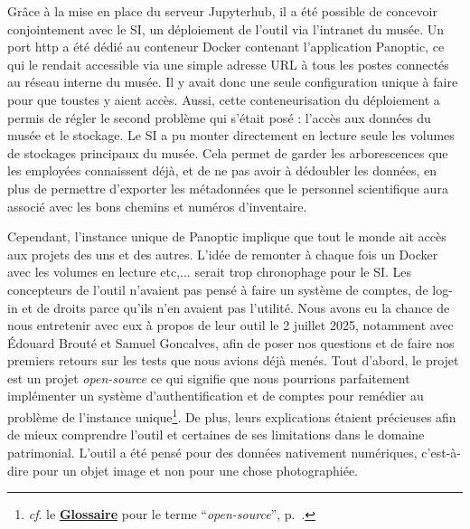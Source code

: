 Grâce à la mise en place du serveur Jupyterhub, il a été possible de concevoir conjointement avec le SI, un déploiement de l'outil via l'intranet du musée. Un port http a été dédié au conteneur Docker contenant l'application Panoptic, ce qui le rendait accessible via une simple adresse URL à tous les postes connectés au réseau interne du musée. Il y avait donc une seule configuration unique à faire pour que tous\wokisme tes y aient accès. Aussi, cette conteneurisation du déploiement a permis de régler le second problème qui s'était posé : l'accès aux données du musée et le stockage. Le SI a pu monter directement en lecture seule les volumes de stockages principaux du musée. Cela permet de garder les arborescences que les employé\wokisme e\wokisme s connaissent déjà, et de ne pas avoir à dédoubler les données, en plus de permettre d'exporter les métadonnées que le personnel scientifique aura associé avec les bons chemins et numéros d'inventaire. 

Cependant, l'instance unique de Panoptic implique que tout le monde ait accès aux projets des uns et des autres. L'idée de remonter à chaque fois un Docker avec les volumes en lecture etc,... serait trop chronophage pour le SI. Les concepteurs de l'outil n'avaient pas pensé à faire un système de comptes, de log-in et de droits parce qu'ils n'en avaient pas l'utilité. Nous avons eu la chance de nous entretenir avec eux à propos de leur outil le 2 juillet 2025, notamment avec Édouard Brouté et Samuel Goncalves, afin de poser nos questions et de faire nos premiers retours sur les tests que nous avions déjà menés. Tout d'abord, le projet est un projet \textit{open-source} ce qui signifie que nous pourrions parfaitement implémenter un système d'authentification et de comptes pour remédier au problème de l'instance unique\footnote{\textit{cf}. le \textbf{\hyperref[sec:Glossaire]{Glossaire}} pour le terme \enquote{\textit{open-source}}, p.~\pageref{sec:Glossaire}.}. De plus, leurs explications étaient précieuses afin de mieux comprendre l'outil et certaines de ses limitations dans le domaine patrimonial. L'outil a été pensé pour des données nativement numériques, c'est-à-dire pour un objet image et non pour une chose photographiée. 

